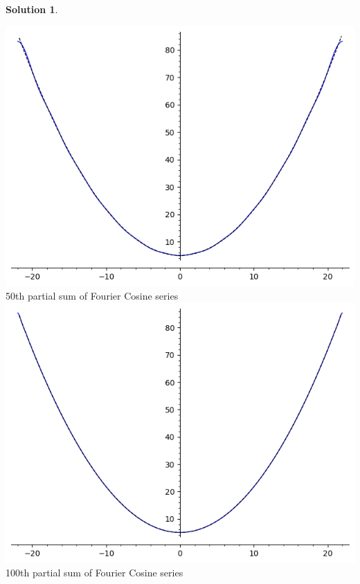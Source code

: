 \documentclass[10pt]{article}
\theoremstyle{definition}
\newtheorem{soln}{Solution}
\begin{document}
\begin{soln}
\begin{enumerate}[label=(\alph*)]
\begin{tcolorbox}[breakable, size=fbox, boxrule=.5pt, pad at break*=1mm, opacityfill=0]
            \includegraphics[scale=0.75]{graphs/g2c.png}\\
            50th partial sum of Fourier Cosine series\\
            \includegraphics[scale=0.75]{graphs/g3c.png}\\
            100th partial sum of Fourier Cosine series\\

\end{tcolorbox}
\end{enumerate}
\end{soln}
\end{document}
